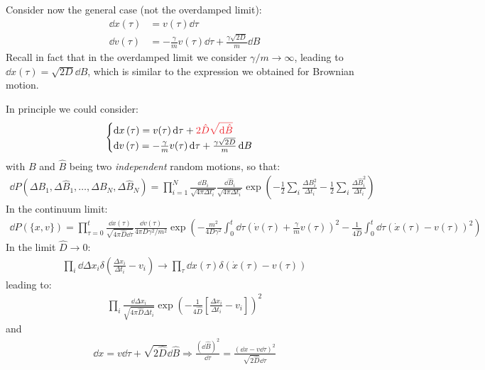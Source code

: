 \documentclass[../template.tex]{subfiles}
\begin{document}
Consider now the general case (not the overdamped limit):
\begin{align*}
    \dd{x}(\tau) &= v(\tau) \dd{\tau} \\
    \dd{v}(\tau) &= -\frac{\gamma}{m} v(\tau) \dd{\tau} + \frac{\gamma \sqrt{2D}}{m} \dd{B}  
\end{align*}
Recall in fact that in the overdamped limit we consider $\gamma/m \to \infty$, leading to $\dd{x}(\tau) = \sqrt{2D} \dd{B}$, which is similar to the expression we obtained for Brownian motion.

In principle we could consider:
\begin{align*}
    \begin{cases}
        \dd{x}(\tau) = v(\tau) \dd{\tau} + \textcolor{Red}{2 \hat{D}\sqrt{\dd{\hat{B}}}}\\
        \dd{v}(\tau) = -\frac{\gamma}{m} v(\tau) \dd{\tau} + \frac{\gamma \sqrt{2D}}{m} \dd{B}  
    \end{cases}
\end{align*}
with $B$ and $\hat{B}$ being two \textit{independent} random motions, so that:
\begin{align*}
    \dd{P} (\Delta B_1, \Delta \hat{B}_1, \dots, \Delta B_N, \Delta \hat{B}_N) = \prod_{i=1}^N \frac{\dd{B}_i}{\sqrt{4 \pi  \Delta t_i}} \frac{\dd{\hat{B}_i}}{\sqrt{4 \pi \Delta t_i}} \exp\left(-\frac{1}{2} \sum_i \frac{\Delta B_i^2}{\Delta t_i}  - \frac{1}{2} \sum_i \frac{\Delta \hat{B}_i^2}{\Delta t_i}    \right)  
\end{align*}
In the continuum limit:
\begin{align*}
    \dd{P}\left(\{x,v\}\right) = \prod_{\tau = 0}^t \frac{\dd{x(\tau)}}{\sqrt{4 \pi \hat{D} \dd{\tau}}} \frac{\dd{v(\tau)}}{4 \pi D \gamma^2/m^2} \exp\left(-\frac{m^2}{4 D \gamma^2} \int_0^t \dd{\tau}\left(\dot{v}(\tau) + \frac{\gamma}{m}v(\tau) \right)^2- \frac{1}{4 \hat{D}}\int_0^t \dd{\tau}(\dot{x}(\tau) - v(\tau))^2  \right) 
\end{align*}
In the limit $\hat{D} \to 0$:
\begin{align*}
    \prod_i \dd{\Delta x_i} \delta\left(\frac{\Delta x_i}{\Delta t_i} - v_i \right) \to \prod_\tau \dd{x}(\tau) \delta(\dot{x}(\tau) - v(\tau))
 \end{align*} 
 leading to:
 \begin{align*}
     \prod_i \frac{\dd{\Delta x_i}}{\sqrt{4 \pi \hat{D} \Delta t_i}} \exp\left(-\frac{1}{4 \hat{D}}\left[\frac{\Delta x_i}{\Delta t_i} - v_i\right] \right)^2
 \end{align*}
 and
 \begin{align*}
     \dd{x} = v\dd{\tau} + \sqrt{2 \hat{D}} \dd{\hat{B}} \Rightarrow \frac{(\dd{\hat{B}})^2}{\dd{\tau}} = \frac{(\dd{x} - v \dd{\tau})^2}{\sqrt{2 \hat{D}} \dd{\tau}}  
 \end{align*}
\end{document}
